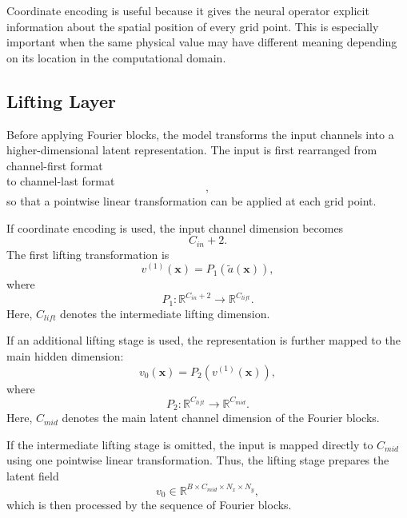 Coordinate encoding is useful because it gives the neural operator explicit information about the spatial position of every grid point. This is especially important when the same physical value may have different meaning depending on its location in the computational domain.

\subsection{Lifting Layer}

Before applying Fourier blocks, the model transforms the input channels into a higher-dimensional latent representation. The input is first rearranged from channel-first format
\begin{equation}
[B, C_{in}, N_x, N_y]
\end{equation}
to channel-last format
\begin{equation}
[B, N_x, N_y, C_{in}],
\end{equation}
so that a pointwise linear transformation can be applied at each grid point.

If coordinate encoding is used, the input channel dimension becomes
\begin{equation}
C_{in} + 2.
\end{equation}
The first lifting transformation is
\begin{equation}
v^{(1)}(\boldsymbol{x})
=
P_1
\left(
\tilde{a}(\boldsymbol{x})
\right),
\end{equation}
where
\begin{equation}
P_1:
\mathbb{R}^{C_{in}+2}
\rightarrow
\mathbb{R}^{C_{lift}}.
\end{equation}
Here, \(C_{lift}\) denotes the intermediate lifting dimension.

If an additional lifting stage is used, the representation is further mapped to the main hidden dimension:
\begin{equation}
v_0(\boldsymbol{x})
=
P_2
\left(
v^{(1)}(\boldsymbol{x})
\right),
\end{equation}
where
\begin{equation}
P_2:
\mathbb{R}^{C_{lift}}
\rightarrow
\mathbb{R}^{C_{mid}}.
\end{equation}
Here, \(C_{mid}\) denotes the main latent channel dimension of the Fourier blocks.

If the intermediate lifting stage is omitted, the input is mapped directly to \(C_{mid}\) using one pointwise linear transformation. Thus, the lifting stage prepares the latent field
\begin{equation}
v_0
\in
\mathbb{R}^{B \times C_{mid} \times N_x \times N_y},
\end{equation}
which is then processed by the sequence of Fourier blocks.

